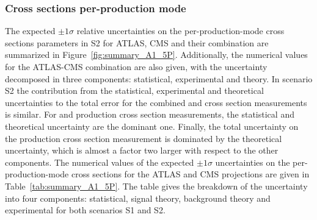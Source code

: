 








\subsubsection{Cross sections per-production mode}

The expected $\pm 1\sigma$ relative uncertainties on the per-production-mode cross sections parameters in S2 for ATLAS, CMS and their combination are summarized in Figure~\ref{fig:summary_A1_5P}.
Additionally, the numerical values for the ATLAS-CMS combination  are also given, with the uncertainty decomposed in three components: statistical, experimental and theory.
In scenario S2 the contribution from the statistical, experimental and theoretical uncertainties to the total error for the combined  \ggh and \vbf cross section measurements is similar. For \wh and \zh production cross section measurements, the statistical  and theoretical uncertainty are the dominant one.
Finally, the total uncertainty on the \tth production cross section measurement is dominated by the theoretical uncertainty, which is almost a factor two larger with respect to the other components.
The numerical values of the expected $\pm 1\sigma$ uncertainties on the per-production-mode cross sections for the ATLAS and CMS projections are given in Table~\ref{tab:summary_A1_5P}. The table  gives the breakdown of the uncertainty into four components: statistical, signal theory, background theory and experimental for both scenarios S1 and S2. 

